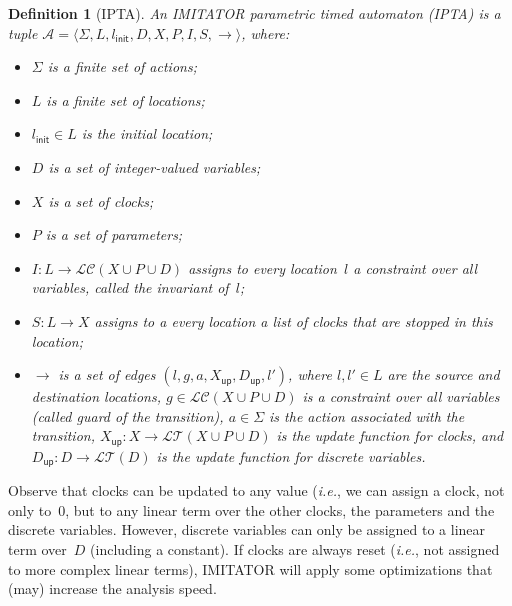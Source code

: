 \documentclass[a4paper,11pt]{report}
\def\init{\ensuremath{\textsf{init}}} %
\newcommand{\A}{\mathcal{A}}
\newcommand{\Action}{\ensuremath{\Sigma}}
\newcommand{\action}{a}
\newcommand{\Clock}{X} %
\newcommand{\Cupdates}{\Clock_\mathsf{up}}
\newcommand{\Dupdates}{\DVar_\mathsf{up}}
\newcommand{\DVar}{D} %
\newcommand{\guard}{g}
\newcommand{\invariant}{I}
\newcommand{\LConstraint}{\mathcal{LC}} %
\newcommand{\LConstraintXPD}{\LConstraint(\Clock \cup \Param \cup \DVar)}
\newcommand{\LTerm}{\mathcal{LT}} %
\newcommand{\LTermD}{\LTerm(\DVar)}
\newcommand{\LTermXPD}{\LTerm(\Clock \cup \Param \cup \DVar)}
\newcommand{\loc}{l} %
\newcommand{\locinit}{\loc_\init}
\newcommand{\Loc}{L} %
\newcommand{\Param}{P} %
\newcommand{\steps}{ {\rightarrow} }
\newcommand{\stopwatches}{S}
\newcommand{\tuple}[1]{\langle#1\rangle}
\newcommand{\imitator}{\textsf{IMITATOR}}
\newcommand{\IPTA}{IPTA}
\newtheorem{definition}{Definition}
\newcommand{\ie}{\textcolor{colorok}{\textit{i.e.}, }}
\begin{document}
\begin{definition}[\IPTA{}]\label{definition:IPTA}
	An \imitator{} parametric timed automaton (\emph{\IPTA{}}) is a tuple $\A = \tuple{\Action, \Loc, \locinit, \DVar, \Clock, \Param, \invariant, \stopwatches, \steps}$, where:
	\begin{itemize}
		\item $\Action$ is a finite set of actions;
		\item $\Loc$ is a finite set of locations;
		\item $\locinit \in \Loc$ is the initial location;
		\item $\DVar$ is a set of integer-valued variables;
		\item $\Clock$ is a set of clocks;
		\item $\Param$ is a set of parameters;
		\item $\invariant : \Loc \rightarrow \LConstraintXPD$ assigns to every location~$\loc$ a constraint over all variables, called the \emph{invariant} of~$\loc$;
		\item $\stopwatches : \Loc \rightarrow \Clock$ assigns to a every location a list of clocks that are stopped in this location;
		\item $\steps$ is a set of edges $(\loc, \guard, \action, \Cupdates, \Dupdates, \loc')$, where
			$\loc, \loc' \in \Loc$ are the source and destination locations,
			$\guard \in \LConstraintXPD$ is a constraint over all variables (called \emph{guard} of the transition),
			$\action\in\Sigma$ is the action associated with the transition,
			$\Cupdates : \Clock \rightarrow \LTermXPD$ is the update function for clocks, and %
			$\Dupdates : \DVar \rightarrow \LTermD$ is the update function for discrete variables. %
	\end{itemize}
\end{definition}

Observe that clocks can be updated to any value (\ie{} we can assign a clock, not only to~0, but to any linear term over the other clocks, the parameters and the discrete variables.
However, discrete variables can only be assigned to a linear term over~$\DVar$ (including a constant).
If clocks are always reset (\ie{} not assigned to more complex linear terms), \imitator{} will apply some optimizations that (may) increase the analysis speed.
\end{document}
